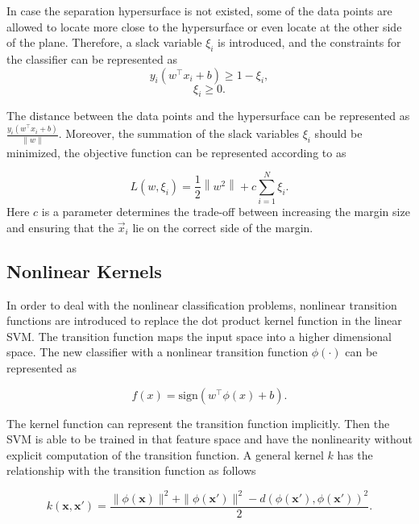 In case the separation hypersurface is not existed, some of the data points are allowed to locate more close to the hypersurface or even locate at the other side of the plane. Therefore, a slack variable $\xi_{i}$ is introduced, and the constraints for the classifier can be represented as
\begin{equation}
y_{i}(w^\top x_{i}+b)\geqslant 1 - \xi_{i},
\end{equation}
\begin{equation}
\xi_{i}\geqslant 0.
\end{equation}

The distance between the data points and the hypersurface can be represented as $\frac{y_{i}(w^\top x_{i}+b)}{\left \| w \right \|}$. Moreover, the summation of the slack variables $\xi_{i}$ should be minimized, the objective function can be represented according to \cite{suykens1999least} as 

\begin{equation}
L(w, \xi_{i})=\frac{1}{2}\left \| w^{2} \right \|+c\sum_{i=1}^{N} \xi_{i}.
\label{regularization svm}
\end{equation}
Here $c$ is a parameter determines the trade-off between increasing the margin size and ensuring that the ${\vec {x}}_{i}$ lie on the correct side of the margin.

\subsection{Nonlinear Kernels}

In order to deal with the nonlinear classification problems, nonlinear transition functions are introduced to replace the dot product kernel function in the linear SVM. The transition function maps the input space into a higher dimensional space. The new classifier with a nonlinear transition function $\phi(\cdot )$ can be represented as

\begin{equation}
f(x)=\mathrm{sign}( w^\top \phi(x) +b).
\end{equation}

The kernel function can represent the transition function implicitly. Then the SVM is able to be trained in that feature space and have the nonlinearity without explicit computation of the transition function. A general kernel $k$ has the relationship with the transition function as follows

\begin{equation}
k(\mathbf{x}, \mathbf{x'}) =\frac{\| \phi(\mathbf{x}) \|^2+\| \phi(\mathbf{x'}) \|^2-d(\phi(\mathbf{x'}),\phi(\mathbf{x'}))^2}{2}.
\end{equation}

